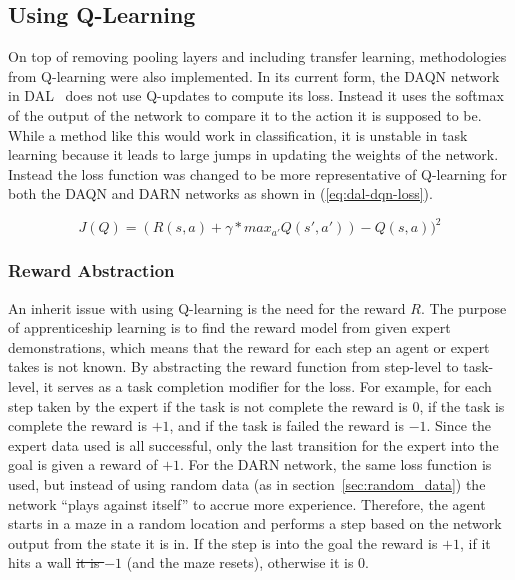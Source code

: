 \documentclass[12pt,american]{report}
\providecommand{\DIFaddtex}[1]{{\protect\color{blue}\uwave{#1}}} %
\providecommand{\DIFdeltex}[1]{{\protect\color{red}\sout{#1}}}                      %
\providecommand{\DIFaddbegin}{} %
\providecommand{\DIFaddend}{} %
\providecommand{\DIFdelbegin}{} %
\providecommand{\DIFdelend}{} %
\providecommand{\DIFadd}[1]{\texorpdfstring{\DIFaddtex{#1}}{#1}} %
\providecommand{\DIFdel}[1]{\texorpdfstring{\DIFdeltex{#1}}{}} %
\newcommand{\DIFscaledelfig}{0.5}
\newlength{\DIFdelgraphicswidth} %
\newlength{\DIFdelgraphicsheight} %
\newcommand{\DIFaddincludegraphics}[2][]{{\color{blue}\fbox{\DIFOincludegraphics[#1]{#2}}}} %
\newcommand{\DIFdelincludegraphics}[2][]{%
\sbox{\DIFdelgraphicsbox}{\DIFOincludegraphics[#1]{#2}}%
\settoboxwidth{\DIFdelgraphicswidth}{\DIFdelgraphicsbox} %
\settoboxtotalheight{\DIFdelgraphicsheight}{\DIFdelgraphicsbox} %
\scalebox{\DIFscaledelfig}{%
\parbox[b]{\DIFdelgraphicswidth}{\usebox{\DIFdelgraphicsbox}\\[-\baselineskip] \rule{\DIFdelgraphicswidth}{0em}}\llap{\resizebox{\DIFdelgraphicswidth}{\DIFdelgraphicsheight}{%
\setlength{\unitlength}{\DIFdelgraphicswidth}%
\begin{picture}(1,1)%
\thicklines\linethickness{2pt} %
{\color[rgb]{1,0,0}\put(0,0){\framebox(1,1){}}}%
{\color[rgb]{1,0,0}\put(0,0){\line( 1,1){1}}}%
{\color[rgb]{1,0,0}\put(0,1){\line(1,-1){1}}}%
\end{picture}%
}\hspace*{3pt}}} %
} %
\DeclareRobustCommand{\DIFaddbegin}{\DIFOaddbegin \let\includegraphics\DIFaddincludegraphics} %
\DeclareRobustCommand{\DIFaddend}{\DIFOaddend \let\includegraphics\DIFOincludegraphics} %
\DeclareRobustCommand{\DIFdelbegin}{\DIFOdelbegin \let\includegraphics\DIFdelincludegraphics} %
\DeclareRobustCommand{\DIFdelend}{\DIFOaddend \let\includegraphics\DIFOincludegraphics} %
\begin{document}
\subsection{Using Q-Learning}
On top of removing pooling layers and including transfer learning, methodologies from Q-learning were also implemented.  In its current form, the DAQN network in DAL~\cite{markovikj2014deep} does not use Q-updates to compute its loss.  Instead it uses the softmax of the output of the network to compare it to the action it is supposed to be.  While a method like this would work in classification, it is unstable in task learning because it leads to large jumps in updating the weights of the network.  Instead the loss function was changed to be more representative of Q-learning for both the DAQN and DARN networks as shown in (\ref{eq:dal-dqn-loss}).

\begin{equation}
     \label{eq:dal-dqn-loss}
     J(Q) =(R(s,a)+\gamma*max_{a'}Q(s',a'))-Q(s,a))^2
\end{equation}
\subsubsection{Reward Abstraction}
An inherit issue with using Q-learning is the need for the reward $R$.  The purpose of apprenticeship learning is to find the reward model from given expert demonstrations, which means that the reward for each step an agent or expert takes is not known. By abstracting the reward function from step-level to task-level, it serves as a task completion modifier for the loss.  For example, for each step taken by the expert if the task is not complete the reward is $0$, if the task is complete the reward is \DIFdelbegin \DIFdel{$+1$}\DIFdelend \DIFaddbegin \DIFadd{$+100$}\DIFaddend , and if the task is failed the reward is \DIFdelbegin \DIFdel{$-1$}\DIFdelend \DIFaddbegin \DIFadd{$-100$}\DIFaddend .  Since the expert data used is all successful, only the last transition for the expert into the goal is given a reward of $+1$.  For the DARN network, the same loss function is used, but instead of using random data (as in section~\ref{sec:random_data}) the network ``plays against itself'' to accrue more experience.  Therefore, the agent starts in a maze in a random location and performs a step based on the network output from the state it is in.  If the step is into the goal the reward is \DIFdelbegin \DIFdel{$+1$}\DIFdelend \DIFaddbegin \DIFadd{$+100$}\DIFaddend , if it hits a wall \DIFdelbegin \DIFdel{it is $-1$ }\DIFdelend \DIFaddbegin \DIFadd{or takes too long it is $-100$ }\DIFaddend (and the maze resets), otherwise it is $0$.  
\end{document}
